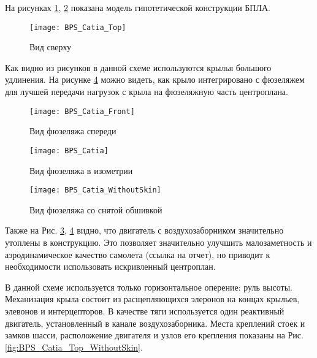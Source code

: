 На рисунках 
\ref{fig:BPS_Catia_Top}, \ref{fig:BPS_Catia_Front} показана модель гипотетической конструкции БПЛА.


\begin{figure}[H]
\centering
\texttt{[image: BPS\_Catia\_Top]}
\caption{Вид сверху}
\label{fig:BPS_Catia_Top}
\end{figure}

Как видно из рисунков в данной схеме используются крылья большого удлинения. На рисунке \ref{fig:BPS_Catia_WithoutSkin} можно видеть, как крыло интегрировано с фюзеляжем для лучшей передачи нагрузок с крыла на фюзеляжную часть центроплана.


\begin{figure}[H]
\centering
\texttt{[image: BPS\_Catia\_Front]}
\caption{Вид фюзеляжа спереди}
\label{fig:BPS_Catia_Front}
\end{figure}




\begin{figure}[H]
\centering
\texttt{[image: BPS\_Catia]}
\caption{Вид фюзеляжа в изометрии}
\label{fig:BPS_Catia}
\end{figure}

\begin{figure}[H]
\centering
\texttt{[image: BPS\_Catia\_WithoutSkin]}
\caption{Вид фюзеляжа со снятой обшивкой}
\label{fig:BPS_Catia_WithoutSkin}
\end{figure}

Также на Рис. \ref{fig:BPS_Catia}, \ref{fig:BPS_Catia_WithoutSkin} видно, что двигатель с воздухозаборником значительно утоплены в конструкцию. Это позволяет значительно улучшить малозаметность и аэродинамическое качество самолета (ссылка на отчет), но приводит к необходимости использовать искривленный центроплан. 

В данной схеме используется только горизонтальное оперение: руль высоты. Механизация крыла состоит из расщепляющихся элеронов на концах крыльев, элевонов и интерцепторов. В качестве тяги используется один реактивный двигатель, установленный в канале воздухозаборника. Места креплений стоек и замков шасси, расположение двигателя и узлов его крепления показаны на Рис. \ref{fig:BPS_Catia_Top_WithoutSkin}. 


